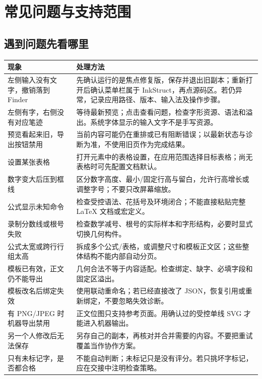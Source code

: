 \chapter{常见问题与支持范围}\label{ch:trouble}
\section{遇到问题先看哪里}
\begin{longtable}{@{}P{39mm}P{115mm}@{}}
\toprule
现象 & 处理方法\\\midrule\endhead
左侧输入没有文字，撤销落到 Finder & 先确认运行的是焦点修复版，保存并退出旧副本；重新打开后确认菜单栏属于 InkStruct，再点源码区。若仍异常，记录应用路径、版本、输入法及操作步骤。\\
左侧有字，右侧没有对应笔迹 & 等待最新预览；点击查看问题，检查字形资源、语法和溢出。系统字体显示的输入文字不是手写资源。\\
预览看起来旧，导出按钮禁用 & 当前内容可能仍在重排或已有阻断错误；以最新状态与诊断为准，不使用旧页作为完成结果。\\
设置某张表格 & 打开元素中的表格设置，在应用范围选择目标表格；尚无表格时可先配置文档默认。\\
数字变大后压到框线 & 区分数字高度、最小/固定行高与留白，允许行高增长或调整字号；不要只改屏幕缩放。\\
公式显示未知命令 & 检查受控语法、花括号及环境闭合；不能直接粘贴完整 LaTeX 文档或宏定义。\\
录制分数线或根号失败 & 检查数学减号、根号的实际样本和字形结构，必要时显式切换几何构件。\\
公式太宽或跨行行组太高 & 拆成多个公式/表格，或调整尺寸和模板正文区；这些整体结构不能内部自动分页。\\
模板已有效，正文仍不能导出 & 几何合法不等于内容适配。检查绑定、缺字、必填字段和固定区溢出。\\
模板改名后绑定失效 & 使用联动重命名；若已经直接改了 JSON，恢复引用或重新绑定，不要忽略失效诊断。\\
有 PNG/JPEG 时机器导出禁用 & 正文位图只支持参考页面。用确认过的受控单线 SVG 才能进入机器输出。\\
另一个人修改后无法保存 & 另存自己的副本，再核对并合并需要的内容。不要把重试覆盖当作协作方案。\\
只有未标记字，是否都合格 & 不能自动判断；未标记只是没有评分。若只挑坏字标记，应在交接中注明检查策略。\\
\bottomrule
\end{longtable}


